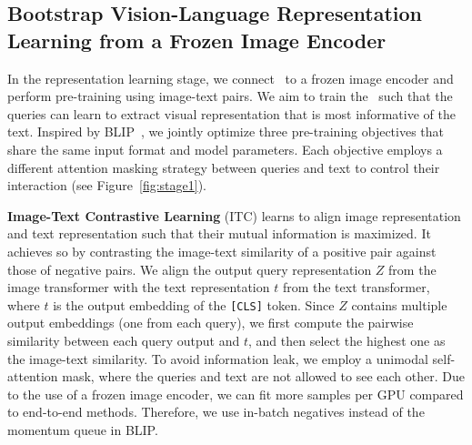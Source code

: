 \subsection{Bootstrap Vision-Language Representation Learning from a Frozen Image Encoder}
\vspace{-0.5ex}
In the representation learning stage, 
we connect \name~to a frozen image encoder and perform pre-training using image-text pairs.
We aim to train the \name~such that the queries can learn to extract visual representation that is most informative of the text.
Inspired by BLIP~\cite{blip}, we jointly optimize three pre-training objectives that share the same input format and model parameters.
Each objective employs a different attention masking strategy between queries and text to control their interaction (see Figure~\ref{fig:stage1}).


\noindent\textbf{Image-Text Contrastive Learning} (ITC) learns to align image representation and text representation such that their mutual information is maximized.
It achieves so by contrasting the image-text similarity of a positive pair against those of negative pairs.
We align the output query representation $Z$ from the image transformer with the text representation $t$ from the text transformer,
where $t$ is the output embedding of the \texttt{[CLS]} token.
Since $Z$ contains multiple output embeddings (one from each query),
we first compute the pairwise similarity between each query output and $t$, and then select the highest one as the image-text similarity.
To avoid information leak, we employ a unimodal self-attention mask,
where the queries and text are not allowed to see each other.
Due to the use of a frozen image encoder, we can fit more samples per GPU compared to end-to-end methods.
Therefore, we use in-batch negatives instead of the momentum queue in BLIP.


